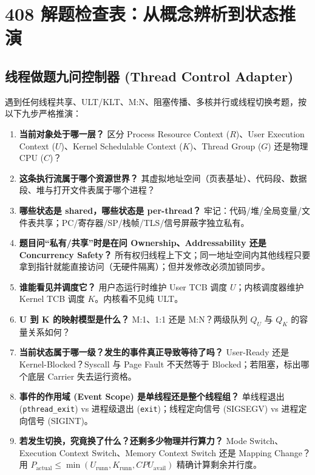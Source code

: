 \documentclass[11pt,a4paper]{ctexart}
\newcommand{\kw}[1]{\textbf{#1}}
\newcommand{\code}[1]{\texttt{#1}}
\begin{document}
\section{408 解题检查表：从概念辨析到状态推演}

\subsection{线程做题九问控制器 (Thread Control Adapter)}

遇到任何线程共享、ULT/KLT、M:N、阻塞传播、多核并行或线程切换考题，按以下九步严格推演：

\begin{enumerate}
\item \kw{当前对象处于哪一层？}
  区分 Process Resource Context ($R$)、User Execution Context ($U$)、Kernel Schedulable Context ($K$)、Thread Group ($G$) 还是物理 CPU ($C$)？
\item \kw{这条执行流属于哪个资源世界？}
  其虚拟地址空间（页表基址）、代码段、数据段、堆与打开文件表属于哪个进程？
\item \kw{哪些状态是 shared，哪些状态是 per-thread？}
  牢记：代码/堆/全局变量/文件表共享；PC/寄存器/SP/栈帧/TLS/信号屏蔽字独立私有。
\item \kw{题目问“私有/共享”时是在问 Ownership、Addressability 还是 Concurrency Safety？}
  所有权归线程上下文；同一地址空间内其他线程只要拿到指针就能直接访问（无硬件隔离）；但并发修改必须加锁同步。
\item \kw{谁能看见并调度它？}
  用户态运行时维护 User TCB 调度 $U$；内核调度器维护 Kernel TCB 调度 $K$。内核看不见纯 ULT。
\item \kw{U 到 K 的映射模型是什么？}
  M:1、1:1 还是 M:N？两级队列 $Q_U$ 与 $Q_K$ 的容量关系如何？
\item \kw{当前状态属于哪一级？发生的事件真正导致等待了吗？}
  User-Ready 还是 Kernel-Blocked？Syscall 与 Page Fault 不天然等于 Blocked；若阻塞，标出哪个底层 Carrier 失去运行资格。
\item \kw{事件的作用域 (Event Scope) 是单线程还是整个线程组？}
  单线程退出 (\code{pthread\_exit}) vs 进程级退出 (\code{exit})；线程定向信号 (SIGSEGV) vs 进程定向信号 (SIGINT)。
\item \kw{若发生切换，究竟换了什么？还剩多少物理并行算力？}
  Mode Switch、Execution Context Switch、Memory Context Switch 还是 Mapping Change？用 $P_{\text{actual}} \le \min(U_{\text{runn}}, K_{\text{runn}}, CPU_{\text{avail}})$ 精确计算剩余并行度。
\end{enumerate}
\end{document}
